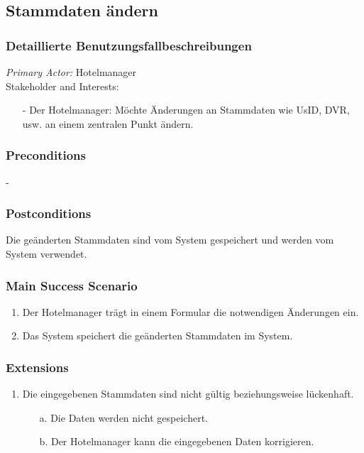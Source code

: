 \documentclass[./detailed_overview_usecases.tex]{subfiles}
\begin{document}
    \subsection{Stammdaten ändern}
    \subsubsection{Detaillierte Benutzungsfallbeschreibungen}
    \textit{Primary Actor:}
    Hotelmanager
    \\
    Stakeholder and Interests:
    \begin{itemize}
        \item[-] Der Hotelmanager: Möchte Änderungen an Stammdaten wie UsID, DVR, usw. an  einem zentralen Punkt ändern.
    \end{itemize}

    \subsubsection*{Preconditions}
    -
    \subsubsection*{Postconditions}
    Die geänderten Stammdaten sind vom System gespeichert und werden vom System verwendet.

    \subsubsection*{Main Success Scenario}
    \begin{enumerate}
        \item Der Hotelmanager trägt in einem Formular die notwendigen Änderungen ein.
        \item Das System speichert die geänderten Stammdaten im System.
    \end{enumerate}

    \subsubsection*{Extensions}
    \begin{enumerate}
        \item Die eingegebenen Stammdaten sind nicht gültig beziehungsweise lückenhaft.
        \begin{itemize}
            \item[a.] Die Daten werden nicht gespeichert.
            \item[b.] Der Hotelmanager kann die eingegebenen Daten korrigieren.
        \end{itemize}
    \end{enumerate}
\end{document}

